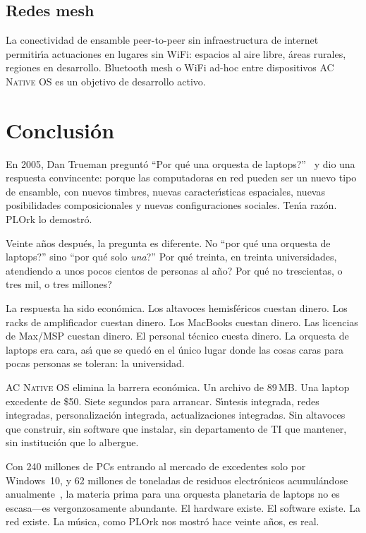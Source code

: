 \documentclass[10pt,letterpaper,twocolumn]{article}
\newcommand{\acos}{\textsc{AC Native OS}}
\begin{document}
\subsection{Redes mesh}

La conectividad de ensamble peer-to-peer sin infraestructura de internet permitir\'{\i}a actuaciones en lugares sin WiFi: espacios al aire libre, \'{a}reas rurales, regiones en desarrollo. Bluetooth mesh o WiFi ad-hoc entre dispositivos \acos{} es un objetivo de desarrollo activo.


\section{Conclusi\'{o}n}

En 2005, Dan Trueman pregunt\'{o} ``\textquestiondown Por qu\'{e} una orquesta de laptops?''~\citep{trueman2007why} y dio una respuesta convincente: porque las computadoras en red pueden ser un nuevo tipo de ensamble, con nuevos timbres, nuevas caracter\'{\i}sticas espaciales, nuevas posibilidades composicionales y nuevas configuraciones sociales. Ten\'{\i}a raz\'{o}n. PLOrk lo demostr\'{o}.

Veinte a\~{n}os despu\'{e}s, la pregunta es diferente. No ``\textquestiondown por qu\'{e} una orquesta de laptops?'' sino ``\textquestiondown por qu\'{e} solo \emph{una}?'' \textquestiondown Por qu\'{e} treinta, en treinta universidades, atendiendo a unos pocos cientos de personas al a\~{n}o? \textquestiondown Por qu\'{e} no trescientas, o tres mil, o tres millones?

La respuesta ha sido econ\'{o}mica. Los altavoces hemisf\'{e}ricos cuestan dinero. Los racks de amplificador cuestan dinero. Los MacBooks cuestan dinero. Las licencias de Max/MSP cuestan dinero. El personal t\'{e}cnico cuesta dinero. La orquesta de laptops era cara, as\'{\i} que se qued\'{o} en el \'{u}nico lugar donde las cosas caras para pocas personas se toleran: la universidad.

\acos{} elimina la barrera econ\'{o}mica. Un archivo de 89\,MB. Una laptop excedente de \$50. Siete segundos para arrancar. S\'{\i}ntesis integrada, redes integradas, personalizaci\'{o}n integrada, actualizaciones integradas. Sin altavoces que construir, sin software que instalar, sin departamento de TI que mantener, sin instituci\'{o}n que lo albergue.

Con 240 millones de PCs entrando al mercado de excedentes solo por Windows~10, y 62 millones de toneladas de residuos electr\'{o}nicos acumul\'{a}ndose anualmente~\citep{forti2024ewaste}, la materia prima para una orquesta planetaria de laptops no es escasa---es vergonzosamente abundante. El hardware existe. El software existe. La red existe. La m\'{u}sica, como PLOrk nos mostr\'{o} hace veinte a\~{n}os, es real.
\end{document}
